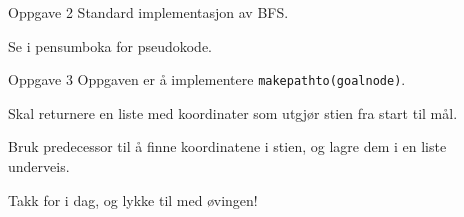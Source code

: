 \documentclass[14pt]{beamer}
\begin{document}
\begin{frame}{Oppgave 2}
    Standard implementasjon av BFS.

    \pause

    Se i pensumboka for pseudokode.
\end{frame}
\begin{frame}[fragile]{Oppgave 3}
    Oppgaven er å implementere \verb|makepathto(goalnode)|.

    \pause

    Skal returnere en liste med koordinater som utgjør stien fra start til mål.

    \pause

    Bruk predecessor til å finne koordinatene i stien, og lagre dem i en liste underveis.
\end{frame}
\begin{frame}[standout]
    Takk for i dag, og lykke til med øvingen!
\end{frame}
\end{document}
